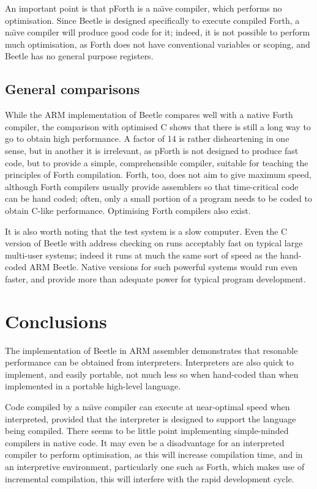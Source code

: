 \documentclass{article}
\begin{document}
An important point is that pForth is a na\"{\i}ve compiler, which performs no
optimisation. Since Beetle is designed specifically to execute compiled
Forth, a na\"{\i}ve compiler will produce good code for it; indeed, it is not
possible to perform much optimisation, as Forth does not have conventional
variables or scoping, and Beetle has no general purpose registers.

\subsection{General comparisons}

While the ARM implementation of Beetle compares well with a native Forth
compiler, the comparison with optimised C shows that there is still a long
way to go to obtain high performance. A factor of 14 is rather disheartening
in one sense, but in another it is irrelevant, as pForth is not designed to
produce fast code, but to provide a simple, comprehensible compiler, suitable
for teaching the principles of Forth compilation. Forth, too, does not aim to
give maximum speed, although Forth compilers usually provide assemblers so
that time-critical code can be hand coded; often, only a small portion of a
program needs to be coded to obtain C-like performance. Optimising Forth
compilers also exist.

It is also worth noting that the test system is a slow computer. Even the C
version of Beetle with address checking on runs acceptably fast on typical
large multi-user systems; indeed it runs at much the same sort of speed as
the hand-coded ARM Beetle. Native versions for such powerful systems would
run even faster, and provide more than adequate power for typical program
development.


\section{Conclusions}

The implementation of Beetle in ARM assembler demonstrates that resonable
performance can be obtained from interpreters. Interpreters are also quick to
implement, and easily portable, not much less so when hand-coded than when
implemented in a portable high-level language.

Code compiled by a na\"{\i}ve compiler can execute at near-optimal speed when
interpreted, provided that the interpreter is designed to support the
language being compiled. There seems to be little point implementing
simple-minded compilers in native code. It may even be a disadvantage for an
interpreted compiler to perform optimisation, as this will increase
compilation time, and in an interpretive environment, particularly one such
as Forth, which makes use of incremental compilation, this will interfere
with the rapid development cycle.
\end{document}
